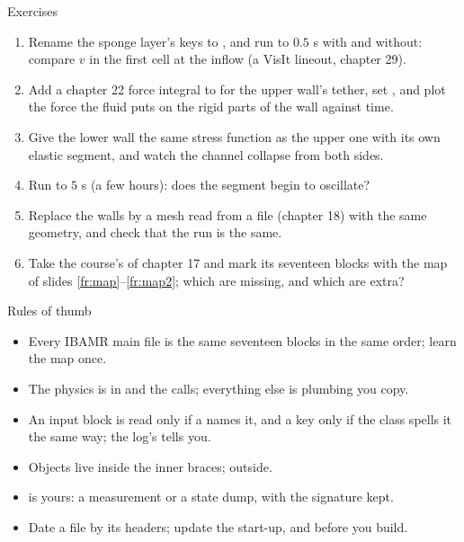 \documentclass[aspectratio=169,11pt]{beamer}
\begin{document}
\begin{frame}{Exercises}
\label{fr:exercises}
\footnotesize
\begin{enumerate}
  \item Rename the sponge layer's keys to ,  and run  to $0.5$ s with and without: compare $v$ in the first cell at the inflow (a VisIt lineout, chapter 29).
  \item Add a chapter 22 force integral to  for the upper wall's tether, set , and plot the force the fluid puts on the rigid parts of the wall against time.
  \item Give the lower wall the same stress function as the upper one with its own elastic segment, and watch the channel collapse from both sides.
  \item Run  to $5$ s (a few hours): does the segment begin to oscillate?
  \item Replace the walls by a mesh read from a file (chapter 18) with the same geometry, and check that the run is the same.
  \item Take the course's  of chapter 17 and mark its seventeen blocks with the map of slides \ref{fr:map}--\ref{fr:map2}; which are missing, and which are extra?
\end{enumerate}
\end{frame}

\begin{frame}{Rules of thumb}
\label{fr:thumb}
\small
\begin{itemize}
  \item Every IBAMR main file is the same seventeen blocks in the same order; learn the map once.
  \item The physics is in  and the  calls; everything else is plumbing you copy.
  \item An input block is read only if a  names it, and a key only if the class spells it the same way; the log's  tells you.
  \item Objects live inside the inner braces;  outside.
  \item {} is yours: a measurement or a state dump, with the signature kept.
  \item Date a file by its headers; update the start-up,  and  before you build.
\end{itemize}
\end{frame}
\end{document}
